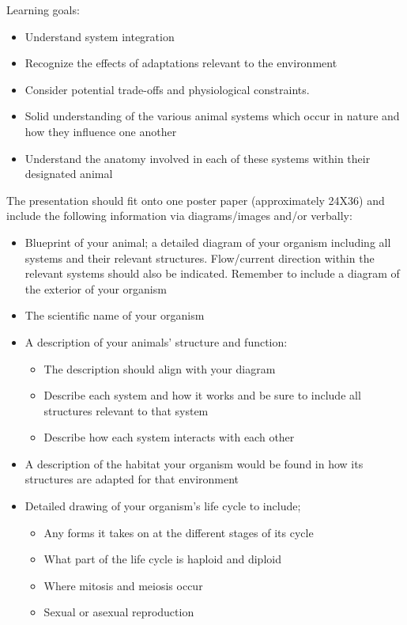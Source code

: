 \documentclass[
]{book}
\providecommand{\tightlist}{%
  \setlength{\itemsep}{0pt}\setlength{\parskip}{0pt}}
\begin{document}
Learning goals:

\begin{itemize}
\tightlist
\item
  Understand system integration
\item
  Recognize the effects of adaptations relevant to the environment
\item
  Consider potential trade-offs and physiological constraints.
\item
  Solid understanding of the various animal systems which occur in nature and how they influence one another
\item
  Understand the anatomy involved in each of these systems within their designated animal
\end{itemize}

The presentation should fit onto one poster paper (approximately 24X36) and include the following information via diagrams/images and/or verbally:

\begin{itemize}
\tightlist
\item
  Blueprint of your animal; a detailed diagram of your organism including all systems and their relevant structures. Flow/current direction within the relevant systems should also be indicated. Remember to include a diagram of the exterior of your organism
\item
  The scientific name of your organism
\item
  A description of your animals' structure and function:

  \begin{itemize}
  \tightlist
  \item
    The description should align with your diagram
  \item
    Describe each system and how it works and be sure to include all structures relevant to that system
  \item
    Describe how each system interacts with each other
  \end{itemize}
\item
  A description of the habitat your organism would be found in how its structures are adapted for that environment
\item
  Detailed drawing of your organism's life cycle to include;

  \begin{itemize}
  \tightlist
  \item
    Any forms it takes on at the different stages of its cycle
  \item
    What part of the life cycle is haploid and diploid
  \item
    Where mitosis and meiosis occur
  \item
    Sexual or asexual reproduction
  \end{itemize}
\end{itemize}
\end{document}
